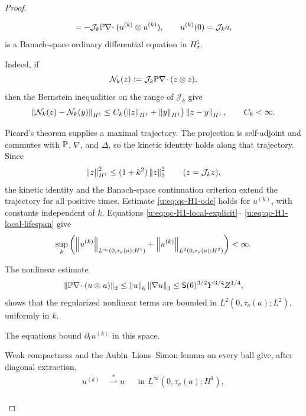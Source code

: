 \begin{proof}
\begin{samepage}
\begin{equation}
 =-\mathcal J_k\mathbb P\nabla\!\cdot
   (u^{(k)}\otimes u^{(k)}),
 \qquad u^{(k)}(0)=\mathcal J_ka,
 \label{u:eq:qc-H1-Friedrichs-system}
\end{equation}
is a Banach-space ordinary differential equation in \(H^1_\sigma\).
\end{samepage}
\begin{samepage}
Indeed, if
\[
 \mathcal N_k(z):=\mathcal J_k\mathbb P\nabla\!\cdot(z\otimes z),
\]
then the Bernstein inequalities on the range of \(\mathcal J_k\) give
\begin{equation}
 \left\lVert \mathcal N_k(z)-\mathcal N_k(y)\right\rVert_{H^1}
 \le C_k\bigl(\left\lVert z\right\rVert_{H^1}+\left\lVert y\right\rVert_{H^1}\bigr)
       \left\lVert z-y\right\rVert_{H^1},
 \qquad C_k<\infty.
 \label{u:eq:qc-H1-Friedrichs-Lipschitz}
\end{equation}
\end{samepage}
Picard's theorem supplies a maximal trajectory.  The projection is
self-adjoint and commutes with \(\mathbb P\), \(\nabla\), and \(\Delta\), so the
kinetic identity holds along that trajectory.  Since
\begin{equation}
 \left\lVert z\right\rVert_{H^1}^2\le(1+k^2)\left\lVert z\right\rVert_2^2
 \qquad(z=\mathcal J_kz),
 \label{u:eq:qc-H1-Friedrichs-band-control}
\end{equation}
the kinetic identity and the Banach-space continuation criterion extend the
trajectory for all positive times.  Estimate
\eqref{u:eq:qc-H1-ode} holds for \(u^{(k)}\), with constants independent of
\(k\).  Equations \eqref{u:eq:qc-H1-local-explicit}--%
\eqref{u:eq:qc-H1-local-lifespan} give
\begin{equation}
 \sup_k\left(
 \left\lVert u^{(k)}\right\rVert_{L^\infty(0,\tau_\nu(a);H^1)}
 +\left\lVert u^{(k)}\right\rVert_{L^2(0,\tau_\nu(a);H^2)}
 \right)<\infty.
 \label{u:eq:qc-H1-Friedrichs-uniform}
\end{equation}
\begin{samepage}
The nonlinear estimate
\[
 \left\lVert \mathbb P\nabla\!\cdot(u\otimes u)\right\rVert_2
 \le \left\lVert u\right\rVert_6\left\lVert \nabla u\right\rVert_3
 \le \mathsf S(6)^{3/2}Y^{3/4}Z^{1/4},
\]
shows that the regularized nonlinear terms are bounded in
\(L^2(0,\tau_\nu(a);L^2)\), uniformly in \(k\).
\par
\end{samepage}
The equations bound
\(\partial_tu^{(k)}\) in this space.
\begin{samepage}
Weak compactness and the
Aubin--Lions--Simon lemma \cite{Aubin1963,Simon1987} on every ball give, after diagonal
extraction,
\begin{align*}
 u^{(k)}&\stackrel{*}{\rightharpoonup} u
 &&\text{in }L^\infty(0,\tau_\nu(a);H^1),\\

\end{align*}
\end{samepage}
\end{proof}
